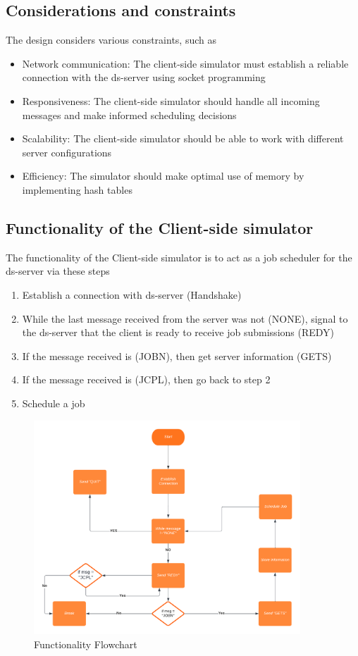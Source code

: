\documentclass[a4paper]{article} %
\begin{document}
\subsection{Considerations and constraints}
The design considers various constraints, such as
\begin{itemize}
    \item Network communication: The client-side simulator must establish a reliable connection with the ds-server using socket programming
    \item Responsiveness: The client-side simulator should handle all incoming messages and make informed scheduling decisions
    \item Scalability: The client-side simulator should be able to work with different server configurations
    \item Efficiency: The simulator should make optimal use of memory by implementing hash tables 
\end{itemize}

\subsection{Functionality of the Client-side simulator}
The functionality of the Client-side simulator is to act as a job scheduler for the ds-server via these steps
\begin{enumerate}
    \item Establish a connection with ds-server (Handshake)
    \item While the last message received from the server was not (NONE), signal to the ds-server that the client is ready to receive job submissions (REDY)
    \item If the message received is (JOBN), then get server information (GETS)
    \item If the message received is (JCPL), then go back to step 2
    \item Schedule a job
\end{enumerate}

\begin{figure}
    \centering
    \includegraphics[width = 100mm,scale=1]{functionality flowchart - Flowchart.png}
    \caption{Functionality Flowchart}
    \label{Functionality Flowchart}
\end{figure}
\end{document}
